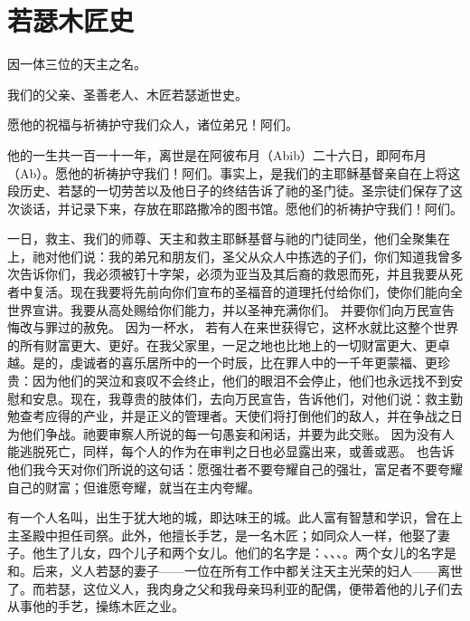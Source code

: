 
\chapter{若瑟木匠史}


因一体三位的天主之名。\par

我们的父亲、圣善老人、木匠若瑟逝世史。\par

愿他的祝福与祈祷护守我们众人，诸位弟兄！阿们。\par

他的一生共一百一十一年，离世是在阿彼布月（Abib）二十六日，即阿布月（Ab）。愿他的祈祷护守我们！阿们。事实上，是我们的主耶稣基督亲自在上将这段历史、若瑟的一切劳苦以及他日子的终结告诉了祂的圣门徒。圣宗徒们保存了这次谈话，并记录下来，存放在耶路撒冷的图书馆。愿他们的祈祷护守我们！阿们。\par

一日，救主、我们的师尊、天主和救主耶稣基督与祂的门徒同坐，他们全聚集在上，祂对他们说：我的弟兄和朋友们，圣父从众人中拣选的子们，你们知道我曾多次告诉你们，我必须被钉十字架，必须为亚当及其后裔的救恩而死，并且我要从死者中复活。现在我要将先前向你们宣布的圣福音的道理托付给你们，使你们能向全世界宣讲。我要从高处赐给你们能力，并以圣神充满你们。 并要你们向万民宣告悔改与罪过的赦免。 因为一杯水， 若有人在来世获得它，这杯水就比这整个世界的所有财富更大、更好。在我父家里，一足之地也比地上的一切财富更大、更卓越。是的，虔诚者的喜乐居所中的一个时辰，比在罪人中的一千年更蒙福、更珍贵：因为他们的哭泣和哀叹不会终止，他们的眼泪不会停止，他们也永远找不到安慰和安息。现在，我尊贵的肢体们，去向万民宣告，告诉他们，对他们说：救主勤勉查考应得的产业，并是正义的管理者。天使们将打倒他们的敌人，并在争战之日为他们争战。祂要审察人所说的每一句愚妄和闲话，并要为此交账。 因为没有人能逃脱死亡，同样，每个人的作为在审判之日也必显露出来，或善或恶。 也告诉他们我今天对你们所说的这句话：愿强壮者不要夸耀自己的强壮，富足者不要夸耀自己的财富；但谁愿夸耀，就当在主内夸耀。\par

有一个人名叫，出生于犹大地的城，即达味王的城。此人富有智慧和学识，曾在上主圣殿中担任司祭。此外，他擅长手艺，是一名木匠；如同众人一样，他娶了妻子。他生了儿女，四个儿子和两个女儿。他们的名字是：、、、。两个女儿的名字是和。后来，义人若瑟的妻子——一位在所有工作中都关注天主光荣的妇人——离世了。而若瑟，这位义人，我肉身之父和我母亲玛利亚的配偶，便带着他的儿子们去从事他的手艺，操练木匠之业。\par

